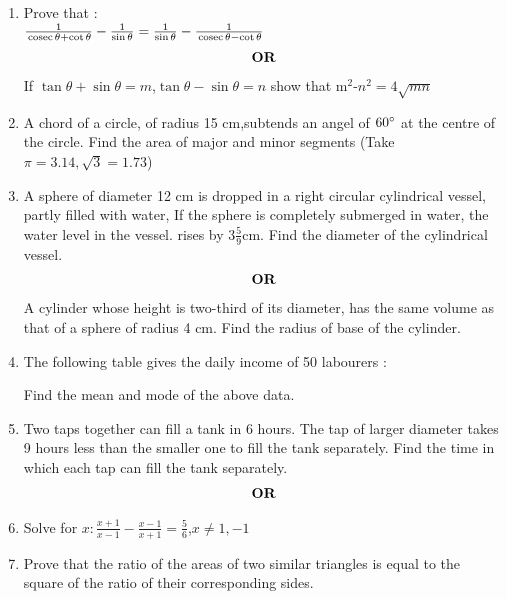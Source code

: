 \documentclass[journal,12pt,twocolumn]{IEEEtran}
\renewcommand\thesection{\arabic{section}}
\begin{document}
\begin{enumerate}[label=\thesection.\arabic*.,ref=\thesection.\theenumi]
\item Prove that : \\ $\frac{1}{\,\text{cosec}\,\theta + \cot\theta}-\frac{1}{\sin\theta}=\frac{1}{\sin\theta}-\frac{1}{\,\text{cosec}\,\theta-\cot\theta}$
\begin{align}
    \centering \vec{OR}\nonumber
\end{align}
If $\tan\theta + \sin\theta = m$,$\tan\theta-\sin\theta=n$ show that m$^2$-$n^2=4\sqrt{mn}$
\item A chord of a circle, of radius 15 cm,subtends an angel of $60\degree$ at the centre of the circle. Find the area of major and minor segments (Take $\pi=3.14, \sqrt{3}=1.73$)
\item A sphere of diameter 12 cm is dropped in a right circular cylindrical vessel, partly filled with water, If the sphere is completely submerged in water, the water level in the vessel. rises by $3\frac{5}{9}$cm. Find the diameter of the cylindrical vessel.
\begin{align}
    \centering \vec{OR}\nonumber
\end{align}
A cylinder whose height is two-third of its diameter, has the same volume as that of a sphere of radius 4 cm. Find the radius of base of the cylinder.
\item The following table gives the daily income of 50 labourers :\\
\begin{table}[htb]
	\centering
Find the mean and mode of the above data.\\
\end{table}
\item Two taps together can fill a tank in 6 hours. The tap of larger diameter takes 9 hours  less than the smaller one to fill the tank separately. Find the time in which each tap can fill the tank separately.
\begin{align}
    \centering \vec{OR}\nonumber
\end{align}
\item Solve for $x : \frac{x+1}{x-1}-\frac{x-1}{x+1}=\frac{5}{6}$,$x\neq1,-1$\\
\item Prove that the ratio of the areas of two similar triangles is equal to the square of the ratio of their corresponding sides.

\end{enumerate}
\end{document}
